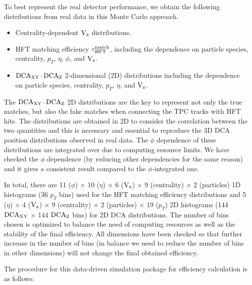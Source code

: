 \documentclass[%
 reprint,	
 amsmath,amssymb,
 aps,
 prc,
]{revtex4-1}
\begin{document}
To best represent the real detector performance, we obtain the following distributions from real data in this Monte Carlo approach.
\begin{itemize}
\item Centrality-dependent $\textup{V}_\textup{z}$ distributions.
\item HFT matching efficiency $\varepsilon_{\rm HFT}^{\rm match}$, including the dependence on particle species, centrality, $p_T$, $\eta$, $\phi$, and $\textup{V}_\textup{z}$.
\item $\textup{DCA}_{\textup{XY}}$--$\textup{DCA}_{\textup{Z}}$ 2-dimensional (2D) distributions including the dependence on particle species, centrality, $p_T$, $\eta$, and $\textup{V}_\textup{z}$.
\end{itemize}
The $\textup{DCA}_{\textup{XY}}$--$\textup{DCA}_{\textup{Z}}$ 2D distributions are the key to represent not only the true matches, but also the fake matches when connecting the TPC tracks with HFT hits. The distributions are obtained in 2D to consider the correlation between the two quantities and this is necessary and essential to reproduce the 3D DCA position distributions observed in real data. The $\phi$ dependence of these distributions are integrated over due to computing resource limits. We have checked the $\phi$ dependence (by reducing other dependencies for the same reason) and it gives a consistent result compared to the $\phi$-integrated one.

In total, there are 11 ($\phi$) $\times$ 10 ($\eta$) $\times$ 6 ($\textup{V}_\textup{z}$) $\times$ 9 (centrality) $\times$ 2 (particles) 1D histograms (36 $p_T$ bins) used for the HFT matching efficiency distributions and 5 ($\eta$) $\times$ 4 ($\textup{V}_\textup{z}$) $\times$ 9 (centrality) $\times$ 2 (particles) $\times$ 19 ($p_T$) 2D histograms (144 $\textup{DCA}_{\textup{XY}}$ $\times$ 144 $\textup{DCA}_{\textup{Z}}$ bins) for 2D DCA distributions. The number of bins chosen is optimized to balance the need of computing resources as well as the stability of the final efficiency. All dimensions have been checked so that further increase in the number of bins (in balance we need to reduce the number of bins in other dimensions)  will not change the final obtained efficiency.

The procedure for this data-driven simulation package for efficiency calculation is as follows:
\end{document}
